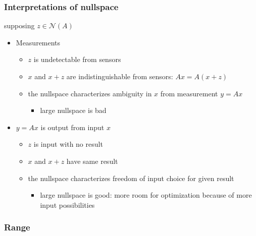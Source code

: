 \documentclass[10pt,letterpaper]{article}
\begin{document}
\subsubsection{Interpretations of nullspace}
\label{sec-2_2_3}

supposing $z \in \mathcal{N}(A)$ 
\begin{itemize}
\item Measurements

\begin{itemize}
\item $z$ is undetectable from sensors
\item $x$ and $x+z$ are indistinguishable from sensors: $Ax = A(x+z)$
\item the nullspace characterizes ambiguity in $x$ from measurement $y=Ax$

\begin{itemize}
\item large nullspace is bad
\end{itemize}

\end{itemize}

\item $y=Ax$ is output from input $x$

\begin{itemize}
\item $z$ is input with no result
\item $x$ and $x+z$ have same result
\item the nullspace characterizes freedom of input choice for given result

\begin{itemize}
\item large nullspace is good: more room for optimization because of more input possibilities
\end{itemize}

\end{itemize}

\end{itemize}
\subsubsection{Range}
\label{sec-2_2_4}
\end{document}
